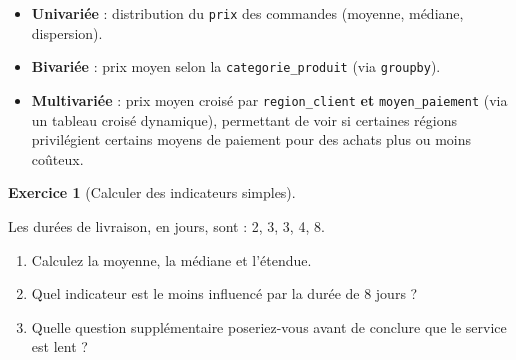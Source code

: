 \documentclass[
  french,
  letterpaper,
  open=any]{scrbook}
\providecommand{\tightlist}{%
  \setlength{\itemsep}{0pt}\setlength{\parskip}{0pt}}
\theoremstyle{definition}
\theoremstyle{definition}
\newtheorem{exercise}{Exercice}[section]
\theoremstyle{remark}
\begin{document}
\begin{tcolorbox}[enhanced jigsaw, arc=.35mm, bottomrule=.15mm, bottomtitle=1mm, breakable, colback=white, colbacktitle=quarto-callout-tip-color!10!white, colframe=quarto-callout-tip-color-frame, coltitle=black, left=2mm, leftrule=.75mm, opacityback=0, opacitybacktitle=0.6, rightrule=.15mm, title=\textcolor{quarto-callout-tip-color}{\faLightbulb}\hspace{0.5em}{Solution de l'exercice Exercice~\ref{exr-eda-3}}, titlerule=0mm, toprule=.15mm, toptitle=1mm]

\begin{itemize}
\tightlist
\item
  \textbf{Univariée} : distribution du \texttt{prix} des commandes
  (moyenne, médiane, dispersion).
\item
  \textbf{Bivariée} : prix moyen selon la \texttt{categorie\_produit}
  (via \texttt{groupby}).
\item
  \textbf{Multivariée} : prix moyen croisé par \texttt{region\_client}
  \textbf{et} \texttt{moyen\_paiement} (via un tableau croisé
  dynamique), permettant de voir si certaines régions privilégient
  certains moyens de paiement pour des achats plus ou moins coûteux.
\end{itemize}

\end{tcolorbox}

\begin{exercise}[Calculer des indicateurs
simples]\protect\hypertarget{exr-eda-4}{}\label{exr-eda-4}

Les durées de livraison, en jours, sont : 2, 3, 3, 4, 8.

\begin{enumerate}
\def\labelenumi{\alph{enumi}.}
\tightlist
\item
  Calculez la moyenne, la médiane et l'étendue.
\item
  Quel indicateur est le moins influencé par la durée de 8 jours ?
\item
  Quelle question supplémentaire poseriez-vous avant de conclure que le
  service est lent ?
\end{enumerate}

\end{exercise}
\end{document}
